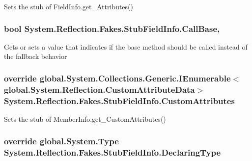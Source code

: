 Sets the stub of Field\-Info.\-get\-\_\-\-Attributes()

\hypertarget{class_system_1_1_reflection_1_1_fakes_1_1_stub_field_info_a99ca125daf187dd6457702d332644eb1}{
\subsubsection[{Call\-Base}]{\setlength{\rightskip}{0pt plus 5cm}bool System.\-Reflection.\-Fakes.\-Stub\-Field\-Info.\-Call\-Base\hspace{0.3cm}{\ttfamily [get]}, {\ttfamily [set]}}}\label{class_system_1_1_reflection_1_1_fakes_1_1_stub_field_info_a99ca125daf187dd6457702d332644eb1}


Gets or sets a value that indicates if the base method should be called instead of the fallback behavior

\hypertarget{class_system_1_1_reflection_1_1_fakes_1_1_stub_field_info_a096e9fd3f69e79e9b9aa4b821dac4923}{
\subsubsection[{Custom\-Attributes}]{\setlength{\rightskip}{0pt plus 5cm}override global.\-System.\-Collections.\-Generic.\-I\-Enumerable$<$global.\-System.\-Reflection.\-Custom\-Attribute\-Data$>$ System.\-Reflection.\-Fakes.\-Stub\-Field\-Info.\-Custom\-Attributes\hspace{0.3cm}{\ttfamily [get]}}}\label{class_system_1_1_reflection_1_1_fakes_1_1_stub_field_info_a096e9fd3f69e79e9b9aa4b821dac4923}


Sets the stub of Member\-Info.\-get\-\_\-\-Custom\-Attributes()

\hypertarget{class_system_1_1_reflection_1_1_fakes_1_1_stub_field_info_a40e62604c293d1e5ac7ff4b8a1039aa9}{
\subsubsection[{Declaring\-Type}]{\setlength{\rightskip}{0pt plus 5cm}override global.\-System.\-Type System.\-Reflection.\-Fakes.\-Stub\-Field\-Info.\-Declaring\-Type\hspace{0.3cm}{\ttfamily [get]}}}\label{class_system_1_1_reflection_1_1_fakes_1_1_stub_field_info_a40e62604c293d1e5ac7ff4b8a1039aa9}


